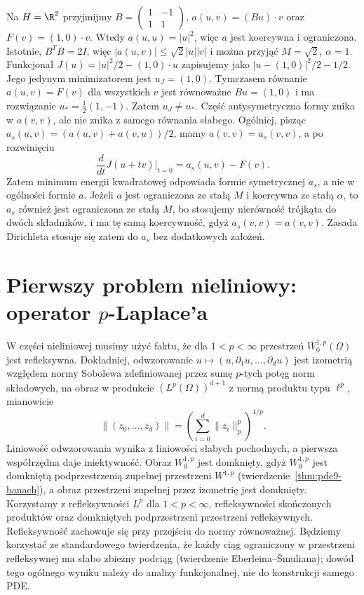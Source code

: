 \begin{kontrprzyklad}
\label{ex:pde11-nonsymmetric}
Na $H=\R^2$ przyjmijmy
$B=\begin{pmatrix}1&-1\\1&1\end{pmatrix}$,
$a(u,v)=(Bu)\cdot v$ oraz $F(v)=(1,0)\cdot v$.
Wtedy $a(u,u)=|u|^2$, więc $a$ jest koercywna i ograniczona.
Istotnie, $B^TB=2I$, więc
$|a(u,v)|\le\sqrt2|u||v|$ i można przyjąć
$M=\sqrt2$, $\alpha=1$.
Funkcjonał $J(u)=|u|^2/2-(1,0)\cdot u$ zapisujemy
jako $|u-(1,0)|^2/2-1/2$. Jego jedynym
minimizatorem jest $u_J=(1,0)$. Tymczasem równanie
$a(u,v)=F(v)$ dla wszystkich $v$ jest równoważne
$Bu=(1,0)$ i ma rozwiązanie $u_*=\frac12(1,-1)$.
Zatem $u_J\ne u_*$. Część antysymetryczna formy znika
w $a(v,v)$, ale nie znika z samego równania słabego.
Ogólniej, pisząc $a_s(u,v)=(a(u,v)+a(v,u))/2$,
mamy $a(v,v)=a_s(v,v)$, a po rozwinięciu
\[
 \frac{d}{dt}J(u+tv)\bigg|_{t=0}=a_s(u,v)-F(v).
\]
Zatem minimum energii kwadratowej odpowiada formie
symetrycznej $a_s$, a nie w ogólności formie $a$.
Jeżeli $a$ jest ograniczona ze stałą $M$ i koercywna
ze stałą $\alpha$, to $a_s$ również jest ograniczona
ze stałą $M$, bo stosujemy nierówność trójkąta
do dwóch składników, i ma tę samą koercywność,
gdyż $a_s(v,v)=a(v,v)$. Zasada Dirichleta stosuje
się zatem do $a_s$ bez dodatkowych założeń.
\end{kontrprzyklad}

\section[Operator p-Laplace'a]{Pierwszy problem nieliniowy: operator $p$-Laplace'a}
\label{sec:pde11-plaplace}

W części nieliniowej musimy użyć faktu, że dla
$1<p<\infty$ przestrzeń $W_0^{1,p}(\Omega)$ jest refleksywna.
Dokładniej, odwzorowanie
$u\mapsto(u,\partial_1u,\ldots,\partial_du)$
jest izometrią względem normy Sobolewa zdefiniowanej
przez sumę $p$-tych potęg norm składowych,
na obraz w produkcie $(L^p(\Omega))^{d+1}$
z normą produktu typu $\ell^p$, mianowicie
\[
 \|(z_0,\ldots,z_d)\|
 =\left(\sum_{i=0}^d\|z_i\|_p^p\right)^{1/p}.
\]
Liniowość odwzorowania wynika z liniowości słabych
pochodnych, a pierwsza współrzędna daje iniektywność.
Obraz $W_0^{1,p}$ jest domknięty, gdyż $W_0^{1,p}$
jest domkniętą podprzestrzenią zupełnej przestrzeni
$W^{1,p}$ (twierdzenie~\ref{thm:pde9-banach}),
a obraz przestrzeni zupełnej przez izometrię jest domknięty.
Korzystamy z refleksywności $L^p$ dla $1<p<\infty$,
refleksywności skończonych produktów oraz domkniętych
podprzestrzeni przestrzeni refleksywnych.
Refleksywność zachowuje się przy przejściu do normy
równoważnej.
Będziemy korzystać ze standardowego twierdzenia, że każdy ciąg
ograniczony w przestrzeni refleksywnej ma słabo zbieżny podciąg
(twierdzenie Eberleina--\v Smuliana); dowód tego ogólnego wyniku
należy do analizy funkcjonalnej, nie do konstrukcji samego PDE.

